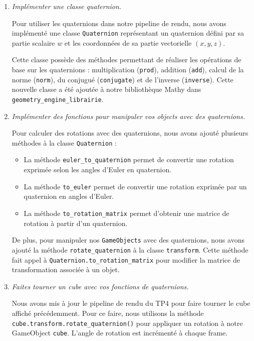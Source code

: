 \documentclass[a4paper,12pt]{article}
\begin{document}
\begin{enumerate}
    \item \emph{Implémenter une classe quaternion.}

    Pour utiliser les quaternions dans notre pipeline de rendu, nous avons implémenté une classe \texttt{Quaternion} représentant un quaternion défini par sa partie scalaire $w$ et les coordonnées de sa partie vectorielle \((x, y, z)\). 
    
    Cette classe possède des méthodes permettant de réaliser les opérations de base sur les quaternions : multiplication (\texttt{prod}), addition (\texttt{add}), calcul de la norme (\texttt{norm}), du conjugué (\texttt{conjugate}) et de l'inverse (\texttt{inverse}).
    Cette nouvelle classe a été ajoutée à notre bibliothèque Mathy dans \texttt{geometry\_engine\_librairie}.

    \item \emph{Implémenter des fonctions pour manipuler vos objects avec des quaternions.}

    Pour calculer des rotations avec des quaternions, nous avons ajouté plusieurs méthodes à la classe \texttt{Quaternion} :
    \begin{itemize}
    \item La méthode \texttt{euler\_to\_quaternion} permet de convertir une rotation exprimée selon les angles d'Euler en quaternion.
    \item La méthode \texttt{to\_euler} permet de convertir une rotation exprimée par un quaternion en angles d'Euler.
    \item La méthode \texttt{to\_rotation\_matrix} permet d'obtenir une matrice de rotation à partir d'un quaternion.
    \end{itemize}

    De plus, pour manipuler nos \texttt{GameObjects} avec des quaternions, nous avons ajouté la méthode \texttt{rotate\_quaternion} à la classe \texttt{transform}. Cette méthode fait appel à \texttt{Quaternion.to\_rotation\_matrix} pour modifier la matrice de transformation associée à un objet.

    \item \emph{Faites tourner un cube avec vos fonctions de quaternions.}

    Nous avons mis à jour le pipeline de rendu du TP4 pour faire tourner le cube affiché précédemment. Pour ce faire, nous utilisons la méthode  \texttt{cube.transform.rotate\_quaternion()} pour appliquer un rotation à notre GameObject \texttt{cube}. L'angle de rotation est incrémenté à chaque frame.


\end{enumerate}
\end{document}
